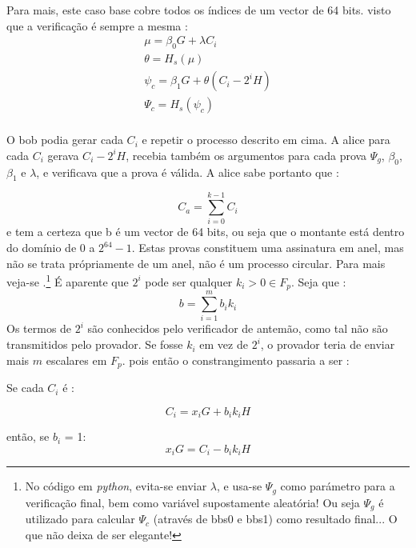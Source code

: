 Para mais, este caso base cobre todos os índices de um vector de 64 bits.
visto que a verificação é sempre a mesma :
\begin{align*}
\mu=\beta_0 G + \lambda C_i\\
\theta= H_s(\mu)\\
\psi_c = \beta_1 G + \theta (C_i - 2^i H)\\
\Psi_c = H_s(\psi_c)\\
\end{align*}

O bob podia gerar cada $C_i$ e repetir o processo descrito em cima. A alice para cada $C_i$ gerava $C_i -2^i H$, recebia também os argumentos para cada prova $\Psi_g$, $\beta_0$, $\beta_1$ e $\lambda$, e verificava que a prova é válida.
A alice sabe portanto que :

\vspace{.175cm}
\[C_{a} = \sum_{i=0}^{k-1} C_{i} \]
\vspace{.175cm}
\newline
e tem a certeza que b é um vector de 64 bits, ou seja que o montante está dentro do domínio de 0 a $2^{64} -1$. Estas provas constituem uma assinatura em anel, mas não se trata própriamente de um anel, não é um processo circular. Para mais veja-se \cite{DangerousFreedom1984} .\footnote{No código em {\em python}, evita-se enviar $\lambda$, e usa-se $\Psi_g$ como parámetro para a verificação final, bem como variável supostamente aleatória! Ou seja $\Psi_g$ é utilizado para calcular $\Psi_c$ (através de bbs0 e bbs1) como resultado final... O que não deixa de ser elegante! }
\newline\newline\newline
É aparente que $2^i$ pode ser qualquer $k_i>0 \in F_p$.
Seja que :
\vspace{.175cm}
\[b = \sum_{i=1}^{m} b_i k_i \]
\vspace{.175cm}
\newline
Os termos de $2^i$ são conhecidos pelo verificador de antemão, como tal não são transmitidos pelo provador. Se fosse $k_i$ em vez de $2^i$, o provador teria de enviar mais $m$ escalares em $F_p$. pois então o constrangimento passaria a ser :

Se cada $C_i$ é :

\vspace{.175cm}
\[C_{i} = x_i G + b_i k_i H \]
\vspace{.175cm}

então, se $b_i$ = 1:
\vspace{.175cm}
\[x_i G = C_{i} - b_i k_i H \]
\vspace{.175cm}

